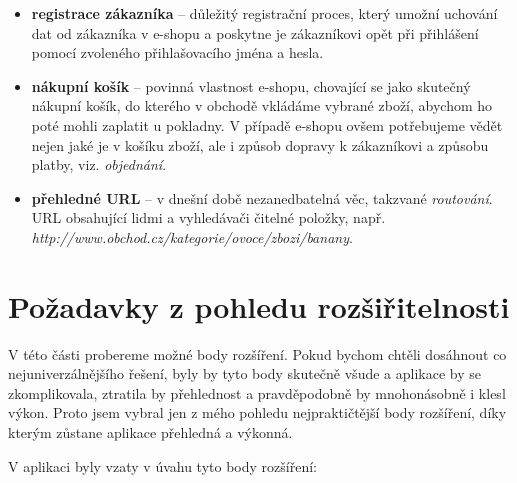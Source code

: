 \documentclass[11pt,twoside,a4paper]{book}
\begin{document}
\begin{itemize}
\item \textbf{registrace zákazníka} -- důležitý registrační proces, který umožní uchování dat od zákazníka v e-shopu a poskytne je zákazníkovi opět při přihlášení pomocí zvoleného přihlašovacího jména a hesla.
\item \textbf{nákupní košík} -- povinná vlastnost e-shopu, chovající se jako skutečný nákupní košík, do kterého v obchodě vkládáme vybrané zboží, abychom ho poté mohli zaplatit u pokladny. V případě e-shopu ovšem potřebujeme vědět nejen jaké je v košíku zboží, ale i způsob dopravy k zákazníkovi a způsobu platby, viz. \textit{objednání}.
\item \textbf{přehledné URL} -- v dnešní době nezanedbatelná věc, takzvané \textit{routování}. URL obsahující lidmi a vyhledávači čitelné položky, např. \\ \textit{http://www.obchod.cz/kategorie/ovoce/zbozi/banany}.
\end{itemize}


\section{Požadavky z pohledu rozšiřitelnosti}
\label{rozfce}

V této části probereme možné body rozšíření. Pokud bychom chtěli dosáhnout co nejuniverzálnějšího řešení, byly by tyto body skutečně všude a aplikace by se zkomplikovala, ztratila by přehlednost a pravděpodobně by mnohonásobně i klesl výkon. Proto jsem vybral jen z mého pohledu nejpraktičtější body rozšíření, díky kterým zůstane aplikace přehledná a výkonná.

V aplikaci byly vzaty v úvahu tyto body rozšíření:
\end{document}
